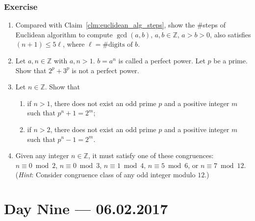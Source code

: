 \documentclass{amsbook}
\theoremstyle{plain}
\theoremstyle{definition}
\theoremstyle{remark}
\numberwithin{equation}{chapter}
\numberwithin{figure}{chapter}
\newcommand{\Z}{\mathbb{Z}}
\begin{document}
\subsection*{Exercise}
\begin{enumerate}
\item Compared with Claim~\ref{clm:euclidean_alg_steps}, show the \#steps of Euclidean algorithm to compute $\gcd (a, b)$, $a, b \in \Z$, $a > b > 0$, also satisfies $(n+1) \leqslant 5 \ell$, where $\ell =\text{\#digits of $b$}$.
\item Let $a, n \in \Z$ with $a, n > 1$. $b = a^n$ is called a perfect power. Let $p$ be a prime. Show that $2^p + 3^p$ is not a perfect power.
\item Let $n \in \Z$. Show that
  \begin{enumerate}
  \item if $n > 1$, there does not exist an odd prime $p$ and a positive integer $m$ such that $p^n + 1 = 2^m$;
  \item if $n > 2$, there does not exist an odd prime $p$ and a positive integer $m$ such that $p^n - 1 = 2^m$.
  \end{enumerate}
\item Given any integer $n \in \Z$, it must satisfy one of these congruences: $n \equiv 0 \bmod 2$, $n \equiv 0 \bmod 3$, $n \equiv 1 \bmod 4$, $n \equiv 5 \bmod 6$, or $n \equiv 7 \bmod 12$. (\emph{Hint}: Consider congruence class of any odd integer modulo $12$.)
\end{enumerate}
\chapter[Lecture Nine]{Day Nine \hfill {\footnotesize \rm --- 06.02.2017}}
\end{document}
